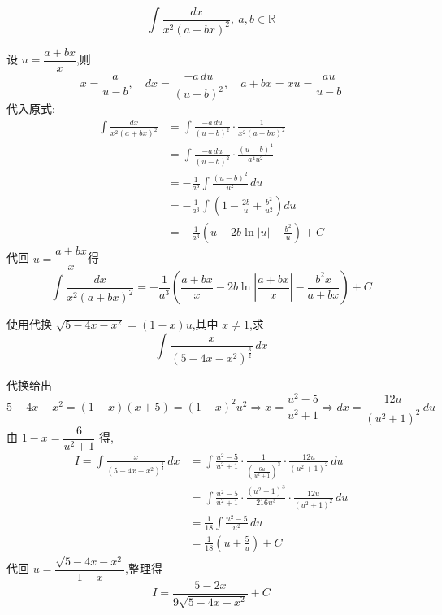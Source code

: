 \begin{questions}
    \question
    \[
    \int \frac{dx}{x^2(a + bx)^2},\ a,b\in\mathbb{R}
    \]
    \begin{solution}
        设 \( u = \dfrac{a + bx}{x} \),则
        \[
        x = \frac{a}{u - b}, \quad 
        dx = \frac{-a\,du}{(u - b)^2}, \quad 
        a + bx = x u = \frac{a u}{u - b}
        \]
        代入原式:
        \begin{align*}
        \int \frac{dx}{x^2(a + bx)^2}
        &= \int \frac{-a\,du}{(u - b)^2} \cdot \frac{1}{x^2 (a + bx)^2} \\
        &= \int \frac{-a\,du}{(u - b)^2} \cdot \frac{(u - b)^4}{a^4 u^2} \\
        &= -\frac{1}{a^3} \int \frac{(u - b)^2}{u^2} \, du \\
        &= -\frac{1}{a^3} \int \left( 1 - \frac{2b}{u} + \frac{b^2}{u^2}\right) du \\
        &= -\frac{1}{a^3} \left( u - 2b \ln|u| - \frac{b^2}{u} \right) + C
        \end{align*}
        代回 \( u = \dfrac{a + bx}{x} \)得
        \[
        \int \frac{dx}{x^2(a + bx)^2}
        = -\frac{1}{a^3} \left( \frac{a + bx}{x} - 2b \ln\left| \frac{a + bx}{x} \right| - \frac{b^2 x}{a + bx} \right) + C
        \]
    \end{solution}

    \question 使用代换 $\sqrt{5-4x-x^2} = (1-x)u$,其中 $x\neq 1$,求 
    \[
    \int \frac{x}{(5-4x-x^2)^{\frac{3}{2}}} \, dx
    \]
    \begin{solution}
        代换给出
        \[
        5-4x-x^2=(1-x)(x+5) = (1-x)^2u^2 \Rightarrow x = \frac{u^2-5}{u^2+1} \Rightarrow dx = \frac{12u}{(u^2+1)^2} \, du
        \]
        由 $1-x = \dfrac{6}{u^2+1}$ 得,
        \begin{align*}
        I =\int \frac{x}{(5-4x-x^2)^{\frac{3}{2}}} \, dx 
        &= \int \frac{u^2-5}{u^2+1} \cdot \frac{1}{\left(\frac{6u}{u^2+1}\right)^3} \cdot \frac{12u}{(u^2+1)^2} \, du \\
        &= \int \frac{u^2-5}{u^2+1} \cdot \frac{(u^2+1)^3}{216u^3} \cdot \frac{12u}{(u^2+1)^2} \, du \\
        &= \frac{1}{18} \int \frac{u^2-5}{u^2} \, du \\
        &= \frac{1}{18} \left( u + \frac{5}{u} \right) + C
        \end{align*}
        代回 $u = \dfrac{\sqrt{5-4x-x^2}}{1-x}$,整理得 
        \[
        I = \frac{5-2x}{9\sqrt{5-4x-x^2}} + C
        \]
    \end{solution}


\end{questions}
